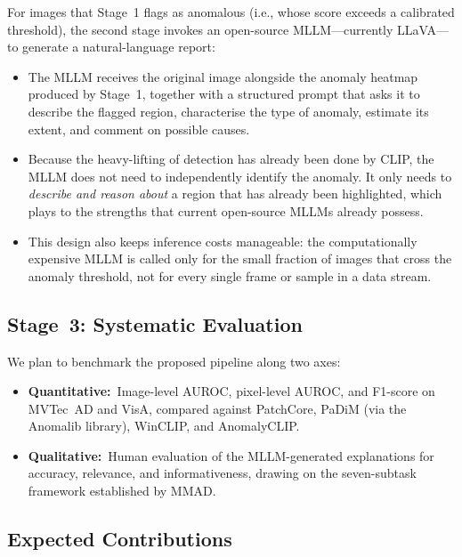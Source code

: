 \documentclass[conference]{IEEEtran}
\begin{document}
For images that Stage~1 flags as anomalous (i.e., whose score exceeds a calibrated threshold), the second stage invokes an open-source MLLM---currently LLaVA---to generate a natural-language report:
\begin{itemize}[leftmargin=*, itemsep=2pt]
    \item The MLLM receives the original image alongside the anomaly heatmap produced by Stage~1, together with a structured prompt that asks it to describe the flagged region, characterise the type of anomaly, estimate its extent, and comment on possible causes.
    \item Because the heavy-lifting of detection has already been done by CLIP, the MLLM does not need to independently identify the anomaly. It only needs to \textit{describe and reason about} a region that has already been highlighted, which plays to the strengths that current open-source MLLMs already possess.
    \item This design also keeps inference costs manageable: the computationally expensive MLLM is called only for the small fraction of images that cross the anomaly threshold, not for every single frame or sample in a data stream.
\end{itemize}

\subsection{Stage~3: Systematic Evaluation}

We plan to benchmark the proposed pipeline along two axes:
\begin{itemize}[leftmargin=*, itemsep=2pt]
    \item \textbf{Quantitative:}\ Image-level AUROC, pixel-level AUROC, and F1-score on MVTec~AD and VisA, compared against PatchCore, PaDiM (via the Anomalib library), WinCLIP, and AnomalyCLIP.
    \item \textbf{Qualitative:}\ Human evaluation of the MLLM-generated explanations for accuracy, relevance, and informativeness, drawing on the seven-subtask framework established by MMAD.
\end{itemize}

\subsection{Expected Contributions}
\end{document}

